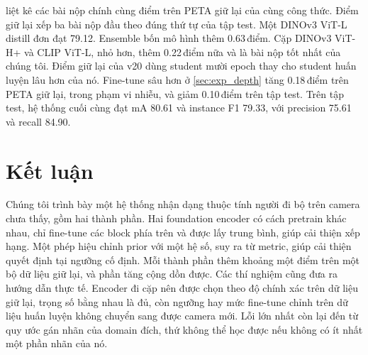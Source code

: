 \documentclass[10pt,twocolumn,letterpaper]{article}
\newcommand{\pts}{\,điểm}
\begin{document}
 liệt kê các bài nộp chính cùng điểm trên PETA giữ lại của cùng công thức. Điểm giữ lại xếp ba bài nộp đầu theo đúng thứ tự của tập test. Một DINOv3 ViT-L distill đơn đạt 79.12. Ensemble bốn mô hình thêm 0.63\pts. Cặp DINOv3 ViT-H+ và CLIP ViT-L, nhỏ hơn, thêm 0.22\pts{} nữa và là bài nộp tốt nhất của chúng tôi. Điểm giữ lại của v20 dùng student mười epoch thay cho student huấn luyện lâu hơn của nó. Fine-tune sâu hơn ở \cref{sec:exp_depth} tăng 0.18\pts{} trên PETA giữ lại, trong phạm vi nhiễu, và giảm 0.10\pts{} trên tập test. Trên tập test, hệ thống cuối cùng đạt mA 80.61 và instance F1 79.33, với precision 75.61 và recall 84.90.

\begin{table}[t]
\centering\small
\setlength{\tabcolsep}{3pt}
\caption{Các bài nộp chính vào UPAR 2027 Track~1.}
\label{tab:test}
\end{table}

\section{Kết luận}
\label{sec:conclusion}

Chúng tôi trình bày một hệ thống nhận dạng thuộc tính người đi bộ trên camera chưa thấy, gồm hai thành phần. Hai foundation encoder có cách pretrain khác nhau, chỉ fine-tune các block phía trên và được lấy trung bình, giúp cải thiện xếp hạng. Một phép hiệu chỉnh prior với một hệ số, suy ra từ metric, giúp cải thiện quyết định tại ngưỡng cố định. Mỗi thành phần thêm khoảng một điểm trên một bộ dữ liệu giữ lại, và phần tăng cộng dồn được. Các thí nghiệm cũng đưa ra hướng dẫn thực tế. Encoder đi cặp nên được chọn theo độ chính xác trên dữ liệu giữ lại, trọng số bằng nhau là đủ, còn ngưỡng hay mức fine-tune chỉnh trên dữ liệu huấn luyện không chuyển sang được camera mới. Lỗi lớn nhất còn lại đến từ quy ước gán nhãn của domain đích, thứ không thể học được nếu không có ít nhất một phần nhãn của nó.
\end{document}
